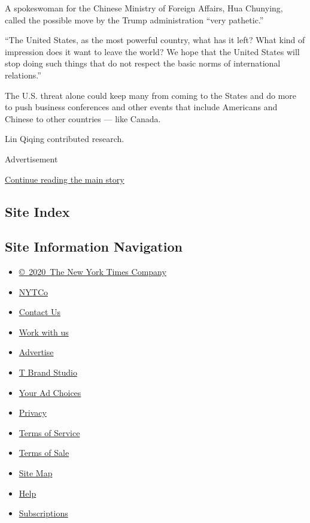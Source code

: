 A spokeswoman for the Chinese Ministry of Foreign Affairs, Hua Chunying,
called the possible move by the Trump administration ``very pathetic.''

``The United States, as the most powerful country, what has it left?
What kind of impression does it want to leave the world? We hope that
the United States will stop doing such things that do not respect the
basic norms of international relations.''

The U.S. threat alone could keep many from coming to the States and do
more to push business conferences and other events that include
Americans and Chinese to other countries --- like Canada.

Lin Qiqing contributed research.

Advertisement

\protect\hyperlink{after-bottom}{Continue reading the main story}

\hypertarget{site-index}{%
\subsection{Site Index}\label{site-index}}

\hypertarget{site-information-navigation}{%
\subsection{Site Information
Navigation}\label{site-information-navigation}}

\begin{itemize}
\tightlist
\item
  \href{https://help.nytimes.com/hc/en-us/articles/115014792127-Copyright-notice}{©~2020~The
  New York Times Company}
\end{itemize}

\begin{itemize}
\tightlist
\item
  \href{https://www.nytco.com/}{NYTCo}
\item
  \href{https://help.nytimes.com/hc/en-us/articles/115015385887-Contact-Us}{Contact
  Us}
\item
  \href{https://www.nytco.com/careers/}{Work with us}
\item
  \href{https://nytmediakit.com/}{Advertise}
\item
  \href{http://www.tbrandstudio.com/}{T Brand Studio}
\item
  \href{https://www.nytimes.com/privacy/cookie-policy\#how-do-i-manage-trackers}{Your
  Ad Choices}
\item
  \href{https://www.nytimes.com/privacy}{Privacy}
\item
  \href{https://help.nytimes.com/hc/en-us/articles/115014893428-Terms-of-service}{Terms
  of Service}
\item
  \href{https://help.nytimes.com/hc/en-us/articles/115014893968-Terms-of-sale}{Terms
  of Sale}
\item
  \href{https://spiderbites.nytimes.com}{Site Map}
\item
  \href{https://help.nytimes.com/hc/en-us}{Help}
\item
  \href{https://www.nytimes.com/subscription?campaignId=37WXW}{Subscriptions}
\end{itemize}
